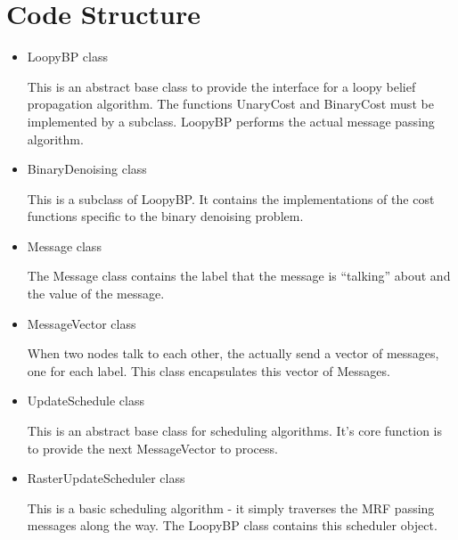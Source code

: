 \documentclass[a4paper,10pt]{article}
\begin{document}
\section{Code Structure}
\begin{itemize}
\item LoopyBP class

This is an abstract base class to provide the interface for a loopy belief propagation algorithm. The functions UnaryCost and BinaryCost must be implemented by a subclass. LoopyBP performs the actual message passing algorithm.

\item BinaryDenoising class

This is a subclass of LoopyBP. It contains the implementations of the cost functions specific to the binary denoising problem.

\item Message class

The Message class contains the label that the message is ``talking'' about and the value of the message.

\item MessageVector class

When two nodes talk to each other, the actually send a vector of messages, one for each label. This class encapsulates this vector of Messages.

\item UpdateSchedule class

This is an abstract base class for scheduling algorithms. It's core function is to provide the next MessageVector to process. 

\item RasterUpdateScheduler class

This is a basic scheduling algorithm - it simply traverses the MRF passing messages along the way. The LoopyBP class contains this scheduler object.


\end{itemize}
\end{document}
